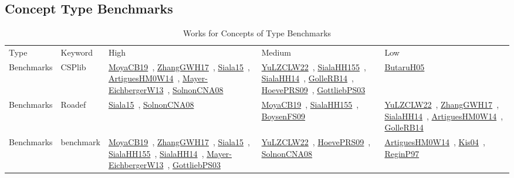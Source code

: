 \clearpage
\subsection{Concept Type Benchmarks}
\label{sec:Benchmarks}
{\scriptsize
\begin{longtable}{lp{3cm}>{\raggedright\arraybackslash}p{6cm}>{\raggedright\arraybackslash}p{6cm}>{\raggedright\arraybackslash}p{8cm}}
\rowcolor{white}\caption{Works for Concepts of Type Benchmarks}\\ \toprule
\rowcolor{white}Type & Keyword & High & Medium & Low\\ \midrule\endhead
\bottomrule
\endfoot
Benchmarks & CSPlib & \href{../cars/works/MoyaCB19.pdf}{MoyaCB19}~\cite{MoyaCB19}, \href{../cars/works/ZhangGWH17.pdf}{ZhangGWH17}~\cite{ZhangGWH17}, \href{../cars/works/Siala15.pdf}{Siala15}~\cite{Siala15}, \href{../cars/works/ArtiguesHM0W14.pdf}{ArtiguesHM0W14}~\cite{ArtiguesHM0W14}, \href{../cars/works/Mayer-EichbergerW13.pdf}{Mayer-EichbergerW13}~\cite{Mayer-EichbergerW13}, \href{../cars/works/SolnonCNA08.pdf}{SolnonCNA08}~\cite{SolnonCNA08} & \href{../cars/works/YuLZCLW22.pdf}{YuLZCLW22}~\cite{YuLZCLW22}, \href{../cars/works/SialaHH155.pdf}{SialaHH155}~\cite{SialaHH155}, \href{../cars/works/SialaHH14.pdf}{SialaHH14}~\cite{SialaHH14}, \href{../cars/works/GolleRB14.pdf}{GolleRB14}~\cite{GolleRB14}, \href{../cars/works/HoevePRS09.pdf}{HoevePRS09}~\cite{HoevePRS09}, \href{../cars/works/GottliebPS03.pdf}{GottliebPS03}~\cite{GottliebPS03} & \href{../cars/works/ButaruH05.pdf}{ButaruH05}~\cite{ButaruH05}\\
Benchmarks & Roadef & \href{../cars/works/Siala15.pdf}{Siala15}~\cite{Siala15}, \href{../cars/works/SolnonCNA08.pdf}{SolnonCNA08}~\cite{SolnonCNA08} & \href{../cars/works/MoyaCB19.pdf}{MoyaCB19}~\cite{MoyaCB19}, \href{../cars/works/SialaHH155.pdf}{SialaHH155}~\cite{SialaHH155}, \href{../cars/works/BoysenFS09.pdf}{BoysenFS09}~\cite{BoysenFS09} & \href{../cars/works/YuLZCLW22.pdf}{YuLZCLW22}~\cite{YuLZCLW22}, \href{../cars/works/ZhangGWH17.pdf}{ZhangGWH17}~\cite{ZhangGWH17}, \href{../cars/works/SialaHH14.pdf}{SialaHH14}~\cite{SialaHH14}, \href{../cars/works/ArtiguesHM0W14.pdf}{ArtiguesHM0W14}~\cite{ArtiguesHM0W14}, \href{../cars/works/GolleRB14.pdf}{GolleRB14}~\cite{GolleRB14}\\
Benchmarks & benchmark & \href{../cars/works/MoyaCB19.pdf}{MoyaCB19}~\cite{MoyaCB19}, \href{../cars/works/ZhangGWH17.pdf}{ZhangGWH17}~\cite{ZhangGWH17}, \href{../cars/works/Siala15.pdf}{Siala15}~\cite{Siala15}, \href{../cars/works/SialaHH155.pdf}{SialaHH155}~\cite{SialaHH155}, \href{../cars/works/SialaHH14.pdf}{SialaHH14}~\cite{SialaHH14}, \href{../cars/works/Mayer-EichbergerW13.pdf}{Mayer-EichbergerW13}~\cite{Mayer-EichbergerW13}, \href{../cars/works/GottliebPS03.pdf}{GottliebPS03}~\cite{GottliebPS03} & \href{../cars/works/YuLZCLW22.pdf}{YuLZCLW22}~\cite{YuLZCLW22}, \href{../cars/works/HoevePRS09.pdf}{HoevePRS09}~\cite{HoevePRS09}, \href{../cars/works/SolnonCNA08.pdf}{SolnonCNA08}~\cite{SolnonCNA08} & \href{../cars/works/ArtiguesHM0W14.pdf}{ArtiguesHM0W14}~\cite{ArtiguesHM0W14}, \href{../cars/works/Kis04.pdf}{Kis04}~\cite{Kis04}, \href{../cars/works/ReginP97.pdf}{ReginP97}~\cite{ReginP97}\\

\end{longtable}}
